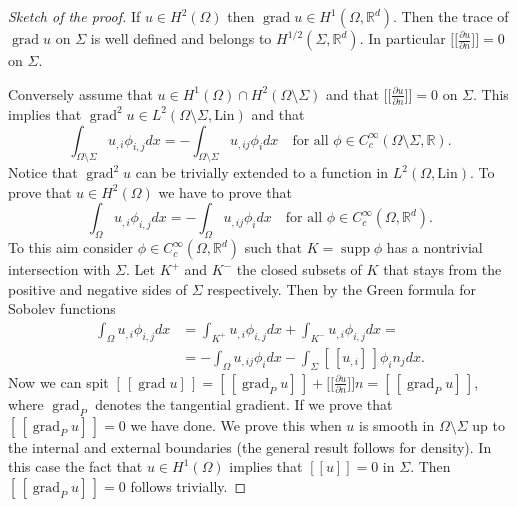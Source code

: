 \documentclass[a4paper,10pt,twoside]{amsbook}
\numberwithin{section}{chapter}
\numberwithin{equation}{chapter}
\theoremstyle{definition}
\DeclareMathOperator{\supp}{supp}
\DeclareMathOperator{\grad}{grad}
\newcommand{\dind}[2]{\frac{\partial #1}{\partial #2}}
\begin{document}
\begin{proof}[Sketch of the proof]
If $u\in H^2(\Omega)$ then $\grad u\in H^1(\Omega,\mathbb{R}^d)$. Then the trace of $\grad u$ on $\Sigma$ is well defined and belongs to $H^{1/2}(\Sigma,\mathbb{R}^d)$. In particular $\big[\!\!\big[\dind{u}{n}\big]\!\!\big]=0$ on $\Sigma$.

Conversely assume that $u\in H^1(\Omega)\cap H^2(\Omega\setminus\Sigma)$ and that $\big[\!\!\big[\dind{u}{n}\big]\!\!\big]=0$ on $\Sigma$. This implies that $\grad^2 u\in L^2(\Omega\setminus\Sigma,\text{Lin})$ and that
\[
\int_{\Omega\setminus\Sigma} u_{,i}\phi_{i,j}dx=-\int_{\Omega\setminus\Sigma} u_{,ij}\phi_idx\quad\text{for all $\phi\in C^\infty_c(\Omega\setminus\Sigma,\mathbb{R})$}.
\]
Notice that $\grad^2 u$ can be trivially extended to a function in $L^2(\Omega,\text{Lin})$. To prove that $u\in H^2(\Omega)$ we have to prove that
\[
\int_{\Omega} u_{,i}\phi_{i,j}dx=-\int_{\Omega} u_{,ij}\phi_{i}dx\quad\text{for all $\phi\in C^\infty_c(\Omega,\mathbb{R}^d)$}.
\]
To this aim consider $\phi\in C^\infty_c(\Omega,\mathbb{R}^d)$ such that $K=\supp\phi$ has a nontrivial intersection with $\Sigma$. Let $K^+$ and $K^-$ the closed subsets of $K$ that stays from the positive and negative sides of $\Sigma$ respectively. Then by the Green formula for Sobolev functions
\[
\begin{split}
\int_{\Omega} u_{,i}\phi_{i,j}dx&=\int_{K^+} u_{,i}\phi_{i,j}dx+\int_{K^-} u_{,i}\phi_{i,j}dx=\\
&=-\int_{\Omega} u_{,ij}\phi_{i}dx-\int_\Sigma[\!\!\,[u_{,i}]\,\!\!]\phi_{i}n_jdx.
\end{split}
\]
Now we can spit $[\!\!\,[\grad u]\,\!\!]=[\!\!\,[\grad_P u]\,\!\!]+\big[\!\!\big[\dind{u}{n}\big]\!\!\big]n=[\!\!\,[\grad_P u]\,\!\!]$, where $\grad_P$ denotes the tangential gradient. If we prove that $[\!\!\,[\grad_P u]\,\!\!]=0$ we have done. We prove this when $u$ is smooth in $\Omega\setminus\Sigma$ up to the internal and external boundaries (the general result follows for density). In this case the fact that $u\in H^1(\Omega)$ implies that $[\![u]\!]=0$ in $\Sigma$. Then $[\!\!\,[\grad_P u]\,\!\!]=0$ follows trivially.
\end{proof}
\end{document}

